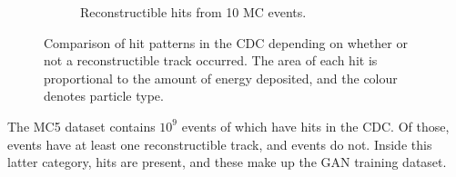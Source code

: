 \begin{figure}
\begin{subfigure}[t]{0.45\textwidth}
        \caption{Reconstructible hits from 10 MC events.}
        \label{fig:cdc_rconst_vs_noise:high}
    \end{subfigure}
    \caption{Comparison of hit patterns in the CDC depending on whether or not a reconstructible track occurred. The area of each hit is proportional to the amount of energy deposited, and the colour denotes particle type.}
    \label{fig:cdc_rconst_vs_noise}
\end{figure}

The MC5 dataset contains $10^{9}$ events of which  have hits in
the CDC. Of those,  events have at least one reconstructible track, and
 events do not. Inside this latter category,  hits are
present, and these make up the GAN training dataset.







